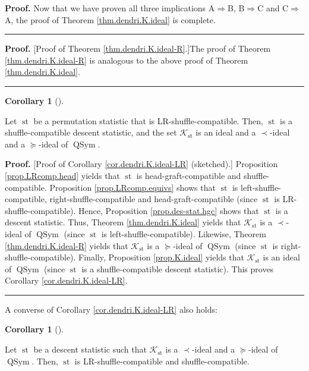 \documentclass[numbers=enddot,12pt,final,onecolumn,notitlepage]{scrartcl}%
\theoremstyle{definition}
\newtheorem{coro}[theo]{Corollary}
\newenvironment{corollary}[1][]
{\begin{coro}[#1]\begin{leftbar}}
{\end{leftbar}\end{coro}}
\newenvironment{proof}[1][Proof]{\noindent\textbf{#1.} }{\ \rule{0.5em}{0.5em}}
\newenvironment{verlong}{}{}
\begin{document}
\begin{verlong}
\begin{proof}
Now that we have proven all three implications A$\Longrightarrow$B,
B$\Longrightarrow$C and C$\Longrightarrow$A, the proof of Theorem
\ref{thm.dendri.K.ideal} is complete.
\end{proof}

\begin{proof}
[Proof of Theorem \ref{thm.dendri.K.ideal-R}.]The proof of Theorem
\ref{thm.dendri.K.ideal-R} is analogous to the above proof of Theorem
\ref{thm.dendri.K.ideal}.
\end{proof}

\begin{corollary}
\label{cor.dendri.K.ideal-LR}Let $\operatorname{st}$ be a permutation
statistic that is LR-shuffle-compatible. Then, $\operatorname{st}$ is a
shuffle-compatible descent statistic, and the set $\mathcal{K}%
_{\operatorname{st}}$ is an ideal and a $\left.  \prec\right.  $-ideal and a
$\left.  \succeq\right.  $-ideal of $\operatorname*{QSym}$.
\end{corollary}

\begin{proof}
[Proof of Corollary \ref{cor.dendri.K.ideal-LR} (sketched).] Proposition
\ref{prop.LRcomp.head} yields that $\operatorname{st}$ is
head-graft-compatible and shuffle-compatible. Proposition
\ref{prop.LRcomp.equivs} shows that $\operatorname{st}$ is
left-shuffle-compatible, right-shuffle-compatible and head-graft-compatible
(since $\operatorname{st}$ is LR-shuffle-compatible). Hence, Proposition
\ref{prop.des-stat.hgc} shows that $\operatorname{st}$ is a descent
statistic. Thus, Theorem \ref{thm.dendri.K.ideal} yields that $\mathcal{K}%
_{\operatorname{st}}$ is a $\left.  \prec\right.  $-ideal of
$\operatorname*{QSym}$ (since $\operatorname{st}$ is
left-shuffle-compatible). Likewise, Theorem \ref{thm.dendri.K.ideal-R} yields
that $\mathcal{K}_{\operatorname{st}}$ is a $\left.  \succeq\right.  $-ideal
of $\operatorname*{QSym}$ (since $\operatorname{st}$ is
right-shuffle-compatible). Finally, Proposition \ref{prop.K.ideal} yields that
$\mathcal{K}_{\operatorname{st}}$ is an ideal of $\operatorname*{QSym}$
(since $\operatorname{st}$ is a shuffle-compatible descent statistic). This
proves Corollary \ref{cor.dendri.K.ideal-LR}.
\end{proof}

A converse of Corollary \ref{cor.dendri.K.ideal-LR} also holds:

\begin{corollary}
\label{cor.dendri.K.ideal-LRi}Let $\operatorname{st}$ be a descent statistic
such that $\mathcal{K}_{\operatorname{st}}$ is a $\left.  \prec\right.
$-ideal and a $\left.  \succeq\right.  $-ideal of $\operatorname*{QSym}$.
Then, $\operatorname{st}$ is LR-shuffle-compatible and shuffle-compatible.
\end{corollary}


\end{verlong}
\end{document}
